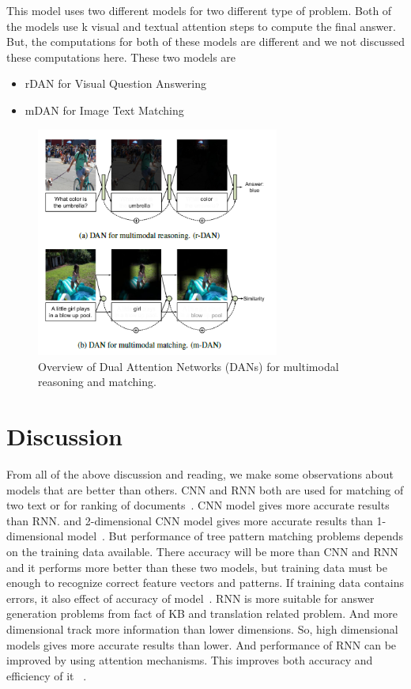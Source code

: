 \documentclass{doublecol-new}
\theoremstyle{TH}{
\newtheorem{lemma}{Lemma}
\newtheorem{theorem}[lemma]{Theorem}
\newtheorem{corrolary}[lemma]{Corrolary}
\newtheorem{conjecture}[lemma]{Conjecture}
\newtheorem{proposition}[lemma]{Proposition}
\newtheorem{claim}[lemma]{Claim}
\newtheorem{stheorem}[lemma]{Wrong Theorem}
\newtheorem{algorithm}{Algorithm}
}
\theoremstyle{THrm}{
\newtheorem{definition}{Definition}[section]
\newtheorem{question}{Question}[section]
\newtheorem{remark}{Remark}
\newtheorem{scheme}{Scheme}
}
\theoremstyle{THhit}{
\newtheorem{case}{Case}[section]
}
\begin{document}
This model uses two different models for two different type of problem. Both of the models use k visual and textual attention steps to compute the final answer. But, the computations for both of these models are different and we not discussed these computations here. These two models are

\begin{itemize}
	\item rDAN for Visual Question Answering   
	\item mDAN for Image Text Matching
\end{itemize}

\begin{figure}[h]
	\centerline{\includegraphics[width=8cm,keepaspectratio]{image/DAN.PNG}}
	\caption{Overview of Dual Attention Networks (DANs)
		for multimodal reasoning and matching.}
	\label{DAN}
\end{figure}
\section{Discussion}
From all of the above discussion and reading, we make some observations about models that are better than others. CNN and RNN both are used for matching of two text or for ranking of documents~\cite{ma2015multimodal}. CNN model gives more accurate results than RNN. and 2-dimensional CNN model gives more accurate results than 1-dimensional model~\cite{hu2014convolutional}. But performance of tree pattern matching problems depends on the training data available. There accuracy will be more than CNN and RNN and it performs more better than these two models, but training data must be enough to recognize correct feature vectors and patterns. If training data contains errors, it also effect of accuracy of model~\cite{wang2015syntax}. RNN is more suitable for answer generation problems from fact of KB and translation related problem. And more dimensional track more information than lower dimensions. So, high dimensional models gives more accurate results than lower. And performance of RNN can be improved by using attention mechanisms. This improves both accuracy and efficiency of it ~\cite{bahdanau2014neural}.  
\end{document}

